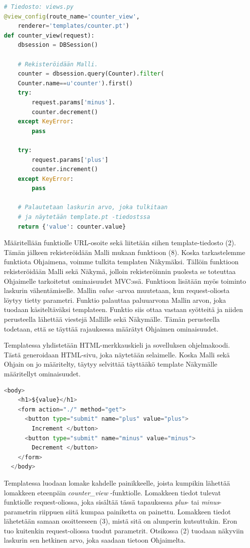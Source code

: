 \documentclass[utf8]{gradu3}
\begin{document}
\begin{lstlisting}[language=Python]
# Tiedosto: views.py
@view_config(route_name='counter_view',
	renderer='templates/counter.pt')
def counter_view(request):
    dbsession = DBSession()

    # Rekisteröidään Malli.
    counter = dbsession.query(Counter).filter(
	Counter.name==u'counter').first()
    try:
        request.params['minus'].
        counter.decrement()
    except KeyError:
        pass

    try:
        request.params['plus']
        counter.increment()
    except KeyError:
        pass

    # Palautetaan laskurin arvo, joka tulkitaan
    # ja näytetään template.pt -tiedostssa
    return {'value': counter.value}
\end{lstlisting}
Määritellään funktiolle URL-osoite sekä liitetään siihen template-tiedosto (2). Tämän jälkeen rekisteröidään Malli mukaan funktioon (8). Koska tarkastelemme funktiota Ohjaimena, voimme tulkita templaten Näkymäksi. Tällöin funktioon rekisteröidään Malli sekä Näkymä, jolloin rekisteröinnin puolesta se toteuttaa Ohjaimelle tarkoitetut ominaisuudet MVC:ssä. Funktioon lisätään myös toiminto laskurin vähentämiselle. Mallin \emph{value} -arvoa muutetaan, kun request-oliosta löytyy tietty parametri. Funktio palauttaa paluuarvona Mallin arvon, joka tuodaan käsiteltäväksi templateen. Funktio siis ottaa vastaan syötteitä ja niiden perusteella lähettää viestejä
Mallille sekä Näkymälle. Tämän perusteella todetaan, että se täyttää rajauksessa määrätyt Ohjaimen ominaisuudet. 

Templatessa yhdistetään HTML-merkkauskieli ja sovelluksen ohjelmakoodi. Tästä generoidaan HTML-sivu, joka näytetään selaimelle. Koska Malli sekä Ohjain on jo määritelty, täytyy selvittää täyttääkö template Näkymälle määritellyt ominaisuudet.
\begin{lstlisting}[language=Python]
  <body>
    <h1>${value}</h1>
    <form action="./" method="get">
      <button type="submit" name="plus" value="plus">
		Increment </button>
      <button type="submit" name="minus" value="minus"> 
		Decrement </button>
    </form>
  </body>
\end{lstlisting}
Templatessa luodaan lomake kahdelle painikkeelle, joista kumpikin lähettää lomakkeen eteenpäin \emph{counter\_view} -funktiolle. Lomakkeen tiedot tulevat funktiolle request-oliossa, joka sisältää tässä tapauksessa \emph{plus}- tai \emph{minus}-parametrin riippuen siitä kumpaa painiketta on painettu. Lomakkeen tiedot lähetetään samaan osoitteeseen (3), mistä sitä on alunperin kutsuttukin. Eron tuo kuitenkin request-oliossa tuodut parametrit.  Otsikossa (2) tuodaan näkyviin laskurin sen hetkinen arvo, joka saadaan tietoon Ohjaimelta.
\end{document}
